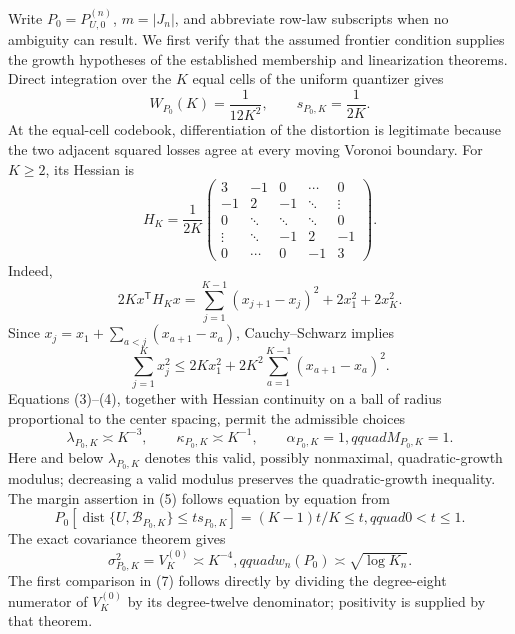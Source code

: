 Write \(P_0=P_{U,0}^{(n)}\), \(m=|J_n|\), and abbreviate row-law subscripts when no ambiguity can result.  We first verify that the assumed frontier condition supplies the growth hypotheses of the established membership and linearization theorems.  Direct integration over the \(K\) equal cells of the uniform quantizer gives
\[
 W_{P_0}(K)=\frac{1}{12K^2},\qquad s_{P_0,K}=\frac{1}{2K}.
 \tag{1}
\]
At the equal-cell codebook, differentiation of the distortion is legitimate because the two adjacent squared losses agree at every moving Voronoi boundary.  For \(K\geq2\), its Hessian is
\[
 H_K=\frac{1}{2K}
 \begin{pmatrix}
 3&-1&0&\cdots&0\\
 -1&2&-1&\ddots&\vdots\\
 0&\ddots&\ddots&\ddots&0\\
 \vdots&\ddots&-1&2&-1\\
 0&\cdots&0&-1&3
 \end{pmatrix}.
 \tag{2}
\]
Indeed,
\[
 2Kx^{\mathsf T}H_Kx
 =\sum_{j=1}^{K-1}(x_{j+1}-x_j)^2+2x_1^2+2x_K^2.
 \tag{3}
\]
Since \(x_j=x_1+\sum_{a<j}(x_{a+1}-x_a)\), Cauchy--Schwarz implies
\[
 \sum_{j=1}^Kx_j^2
 \leq 2Kx_1^2+2K^2\sum_{a=1}^{K-1}(x_{a+1}-x_a)^2.
 \tag{4}
\]
Equations (3)--(4), together with Hessian continuity on a ball of radius proportional to the center spacing, permit the admissible choices
\[
 \lambda_{P_0,K}\asymp K^{-3},\qquad
 \kappa_{P_0,K}\asymp K^{-1},\qquad
 \alpha_{P_0,K}=1,qquad M_{P_0,K}=1.
 \tag{5}
\]
Here and below \(\lambda_{P_0,K}\) denotes this valid, possibly nonmaximal, quadratic-growth modulus; decreasing a valid modulus preserves the quadratic-growth inequality.  The margin assertion in (5) follows equation by equation from
\[
 P_0\!\left[\operatorname{dist}\{U,\mathcal B_{P_0,K}\}\leq t s_{P_0,K}\right]
 =(K-1)t/K\leq t,qquad 0<t\leq1.
 \tag{6}
\]
The exact covariance theorem gives
\[
 \sigma_{P_0,K}^2=V_K^{(0)}\asymp K^{-4},qquad
 w_n(P_0)\asymp\sqrt{\log K_n}.
 \tag{7}
\]
The first comparison in (7) follows directly by dividing the degree-eight numerator of \(V_K^{(0)}\) by its degree-twelve denominator; positivity is supplied by that theorem.

